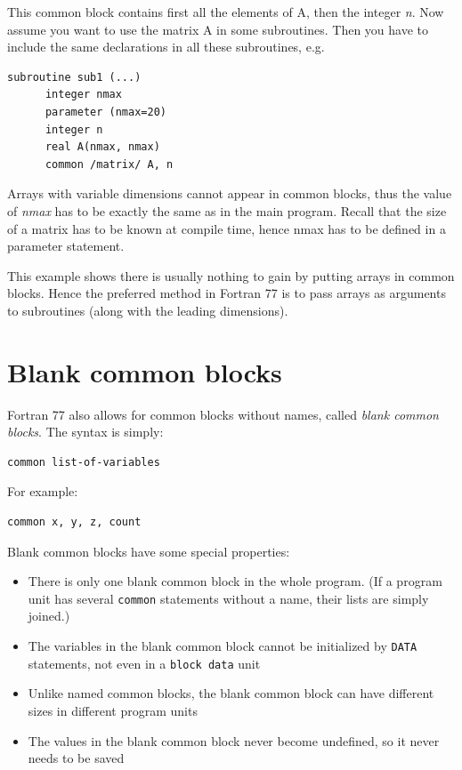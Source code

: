 This common block contains first all the elements of A, then the integer \emph{n}. Now assume you want to use the matrix A in some subroutines. Then you have to include the same declarations in all these subroutines, e.g.

\begin{lstlisting}[style=fortran77]
      subroutine sub1 (...)
      integer nmax
      parameter (nmax=20)
      integer n
      real A(nmax, nmax)
      common /matrix/ A, n
\end{lstlisting}

Arrays with variable dimensions cannot appear in common blocks, thus the value of \emph{nmax} has to be exactly the same as in the main program. Recall that the size of a matrix has to be known at compile time, hence nmax has to be defined in a parameter statement.

This example shows there is usually nothing to gain by putting arrays in common blocks. Hence the preferred method in Fortran 77 is to pass arrays as arguments to subroutines (along with the leading dimensions).

\section{Blank common blocks}

Fortran 77 also allows for common blocks without names, called \emph{blank common blocks}. The syntax is simply:

\begin{lstlisting}[style=fortran77]
      common list-of-variables
\end{lstlisting}

For example:

\begin{lstlisting}[style=fortran77]
      common x, y, z, count
\end{lstlisting}

Blank common blocks have some special properties:

\begin{itemize}
    \item There is only one blank common block in the whole program. (If a program unit has several \texttt{common} statements without a name, their lists are simply joined.)
    \item The variables in the blank common block cannot be initialized by \texttt{DATA} statements, not even in a \texttt{block data} unit
    \item Unlike named common blocks, the blank common block can have different sizes in different program units
    \item The values in the blank common block never become undefined, so it never needs to be saved
\end{itemize}

